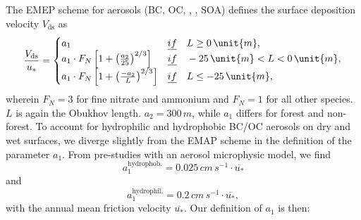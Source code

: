 \documentclass[gmd, manuscript]{copernicus}
\begin{document}
The EMEP scheme for aerosols (BC, OC, , , SOA) defines the surface deposition velocity $V_\text{ds}$ as
\begin{equation}
  \frac{V_\text{ds}}{u_*} =
  \begin{cases}
    a_1 &  \emph{if} \quad L \ge 0\,\unit{m}, \\
    a_1 \cdot F_N \left[ 1 + \left(\frac{a_2}{25}\right)^{2/3}\right] & \emph{if} \quad -25\,\unit{m} < L < 0\,\unit{m}, \\
    a_1 \cdot F_N \left[ 1 + \left(\frac{-a_2}{L}\right)^{2/3}\right] & \emph{if} \quad L \le -25\,\unit{m}, \\
  \end{cases}
\end{equation}
wherein $F_N = 3$ for fine nitrate and ammonium and $F_N = 1$ for all other species. $L$ is again the Obukhov length. $a_2 = 300\,\unit{m}$, while $a_1$ differs for forest and non-forest. To account for hydrophilic and hydrophobic BC/OC aerosols on dry and wet surfaces, we diverge slightly from the EMAP scheme in the definition of the parameter $a_1$. From pre-studies with an aerosol microphysic model, we find
\begin{equation}
  a_1^\text{hydrophob.} = 0.025\,\unit{cm\,s^{-1}} \cdot \overline{u_*}
\end{equation}
and
\begin{equation} 
  a_1^\text{hydrophil.} = 0.2\,\unit{cm\,s^{-1}} \cdot \overline{u_*},
\end{equation}
with the annual mean friction velocity $\overline{u_*}$. Our definition of $a_1$ is then:
\end{document}
